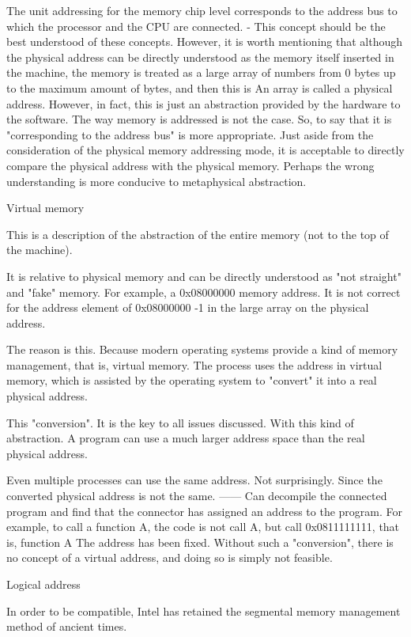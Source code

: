 The unit addressing for the memory chip level corresponds to the address bus to which the processor and the CPU are connected.
- This concept should be the best understood of these concepts. However, it is worth mentioning that although the physical address can be directly understood as the memory itself inserted in the machine, the memory is treated as a large array of numbers from 0 bytes up to the maximum amount of bytes, and then this is An array is called a physical address. However, in fact, this is just an abstraction provided by the hardware to the software. The way memory is addressed is not the case. So, to say that it is "corresponding to the address bus" is more appropriate. Just aside from the consideration of the physical memory addressing mode, it is acceptable to directly compare the physical address with the physical memory. Perhaps the wrong understanding is more conducive to metaphysical abstraction.

{\large Virtual memory}

This is a description of the abstraction of the entire memory (not to the top of the machine).

It is relative to physical memory and can be directly understood as "not straight" and "fake" memory. For example, a 0x08000000 memory address. It is not correct for the address element of 0x08000000 -1 in the large array on the physical address.

The reason is this. Because modern operating systems provide a kind of memory management, that is, virtual memory. The process uses the address in virtual memory, which is assisted by the operating system to "convert" it into a real physical address.

This "conversion". It is the key to all issues discussed.
With this kind of abstraction. A program can use a much larger address space than the real physical address.

Even multiple processes can use the same address. Not surprisingly. Since the converted physical address is not the same.
—— Can decompile the connected program and find that the connector has assigned an address to the program. For example, to call a function A, the code is not call A, but call 0x0811111111, that is, function A The address has been fixed. Without such a "conversion", there is no concept of a virtual address, and doing so is simply not feasible.

{\large Logical address}

In order to be compatible, Intel has retained the segmental memory management method of ancient times.

